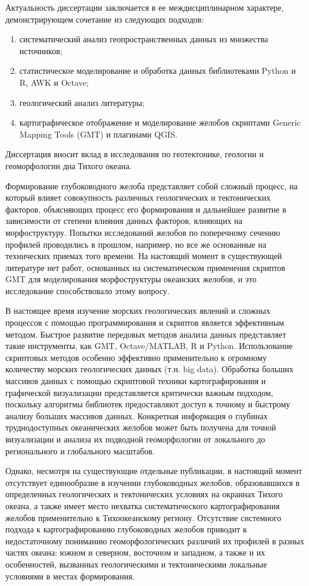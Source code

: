 
{\actuality} Актуальность диссертации заключается в ее междисциплинарном характере, демонстрирующем сочетание из следующих подходов: 

\begin{enumerate}[label=\fbox{\arabic*}]
	\item систематический анализ геопространственных данных из множества источников; 
	\item статистическое моделирование и обработка данных библиотеками Python и R, AWK и Octave; 
	\item геологический анализ литературы; 
	\item картографическое отображение и моделирование желобов скриптами Generic Mapping Tools (GMT) и плагинами QGIS. 
\end{enumerate}
Диссертация вносит вклад в исследования по геотектонике, геологии и геоморфологии дна Тихого океана. 

Формирование глубоководного желоба представляет собой сложный процесс, на который влияет совокупность различных геологических и тектонических факторов, объясняющих процесс его формирования и дальнейшее развитие в зависимости от степени влияния данных факторов, влияющих на морфоструктуру. Попытки исследований желобов по поперечному сечению профилей проводились в прошлом, например, но все же основанные на технических приемах того времени. На настоящий момент в существующей литературе нет работ, основанных на систематическом применения скриптов GMT для моделирования морфоструктуры океанских желобов, и это исследование способствовало этому вопросу.

В настоящее время изучение морских геологических явлений и сложных процессов с помощью программирования и скриптов является эффективным методом. Быстрое развитие передовых методов анализа данных представляет такие инструменты, как GMT, Octave/MATLAB, R и Python. Использование скриптовых методов особенно эффективно применительно к огромному количеству морских геологических данных (т.н. big data). Обработка больших массивов данных с помощью скриптовой техники картографирования и графической визуализации представляется критически важным подходом, поскольку алгоритмы библиотек предоставляют доступ к точному и быстрому анализу больших массивов данных. Конкретная информация о глубинах труднодоступных океанических желобов может быть получена для точной визуализации и анализа их подводной геоморфологии от локального до регионального и глобального масштабов.

Однако, несмотря на существующие отдельные публикации, в настоящий момент отсутствует единообразие в изучении глубоководных желобов, образовавшихся в определенных геологических и тектонических условиях на окраинах Тихого океана, а также имеет место нехватка систематического картографирования желобов применительно к Тихоокеанскому региону. Отсутствие системного подхода к картографированию глубоководных желобов приводит к недостаточному пониманию геоморфологических различий их профилей в разных частях океана: южном и северном, восточном и западном, а также и их особенностей, вызванных геологическими и тектоническими локальные условиями в местах формирования. 

